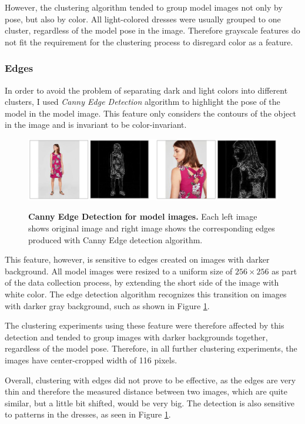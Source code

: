 \documentclass[12pt]{report}
\begin{document}
However, the clustering algorithm tended to group model images not only by pose, but also by color. All light-colored dresses were usually grouped to one cluster, regardless of the model pose in the image. Therefore grayscale features do not fit the requirement for the clustering process to disregard color as a feature.


\subsubsection{Edges}
In order to avoid the problem of separating dark and light colors into different clusters, I used \textit{Canny Edge Detection} algorithm to highlight the pose of the model in the model image. This feature only considers the contours of the object in the image and is invariant to be color-invariant.

\begin{figure}[h]
\centering
{\includegraphics[width=\linewidth]{04_experiments/clustering/edges_data}}
\caption{\label{fig:cluster_edges_data} \textbf{Canny Edge Detection for model images.} Each left image shows original image and right image shows the corresponding edges produced with Canny Edge detection algorithm.}
\end{figure}

This feature, however, is sensitive to edges created on images with darker background. All model images were resized to a uniform size of $256\times256$ as part of the data collection process, by extending the short side of the image with white color. The edge detection algorithm recognizes this transition on images with darker gray background, such as shown in Figure \ref{fig:cluster_edges_data}. 

The clustering experiments using these feature were therefore affected by this detection and tended to group images with darker backgrounds together, regardless of the model pose. Therefore, in all further clustering experiments, the images have center-cropped width of 116 pixels.

Overall, clustering with edges did not prove to be effective, as the edges are very thin and therefore the measured distance between two images, which are quite similar, but a little bit shifted, would be very big. The detection is also sensitive to patterns in the dresses, as seen in Figure \ref{fig:cluster_edges_data}.
\end{document}

